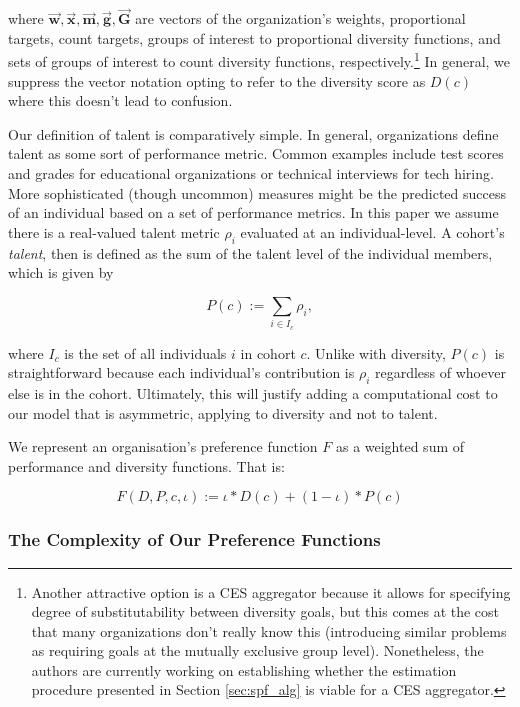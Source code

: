 \noindent where $\vec{\mathbf{w}},\vec{\mathbf{x}}, \vec{\mathbf{m}}, \vec{\mathbf{g}}, \vec{\mathbf{G}}$ are vectors of the organization's weights, proportional targets, count targets, groups of interest to proportional diversity functions, and sets of groups of interest to count diversity functions, respectively.\footnote{Another attractive option is a CES aggregator because it allows for specifying degree of substitutability between diversity goals, but this comes at the cost that many organizations don't really know this (introducing similar problems as requiring goals at the mutually exclusive group level). Nonetheless, the authors are currently working on establishing whether the estimation procedure presented in Section \ref{sec:spf_alg} is viable for a CES aggregator.} In general, we suppress the vector notation opting to refer to the diversity score as $D(c)$ where this doesn't lead to confusion.

Our definition of talent is comparatively simple. In general, organizations define talent as some sort of performance metric. Common examples include test scores and grades for educational organizations or technical interviews for tech hiring. More sophisticated (though uncommon) measures might be the predicted success of an individual based on a set of performance metrics. In this paper we assume there is a real-valued talent metric $\rho_i$ evaluated at an individual-level. A cohort's \emph{talent}, then is defined as the sum of the talent level of the individual members, which is given by

\begin{equation}
P(c) := \sum_{i \in I_c}\rho_i,
\end{equation}

\noindent where $I_c$ is the set of all individuals $i$ in cohort $c$. Unlike with diversity, $P(c)$ is straightforward because each individual's contribution is $\rho_i$ regardless of whoever else is in the cohort. Ultimately, this will justify adding a computational cost to our model that is asymmetric, applying to diversity and not to talent.

We represent an organisation's preference function $F$ as a weighted sum of performance and diversity functions. That is:

\begin{equation}\label{eq:f_spec}
F(D, P, c, \iota) := \iota*D(c)+(1-\iota)*P(c)
\end{equation}

\subsubsection{The Complexity of Our Preference Functions}

